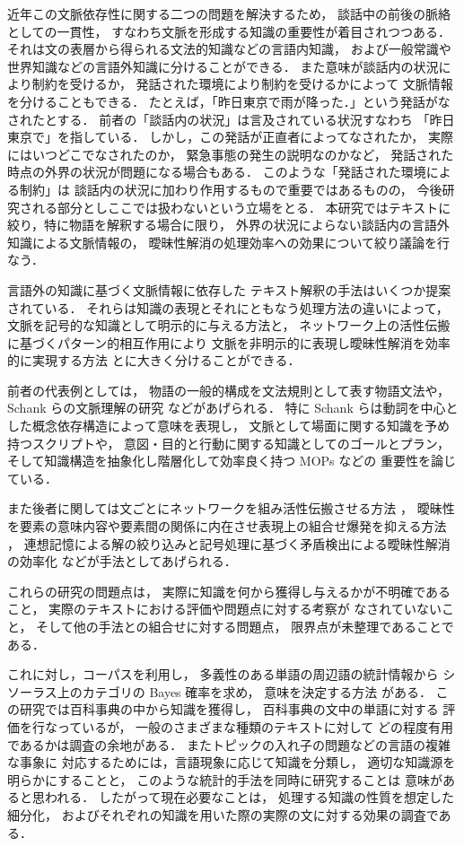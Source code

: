 近年この文脈依存性に関する二つの問題を解決するため，
談話中の前後の脈絡としての一貫性，
すなわち文脈を形成する知識の重要性が着目されつつある．
それは文の表層から得られる文法的知識などの言語内知識，
および一般常識や世界知識などの言語外知識に分けることができる．
また意味が談話内の状況により制約を受けるか，
発話された環境により制約を受けるかによって
文脈情報を分けることもできる．
たとえば，「昨日東京で雨が降った．」という発話がなされたとする．
前者の「談話内の状況」は言及されている状況すなわち
「昨日東京で」を指している．
しかし，この発話が正直者によってなされたか，
実際にはいつどこでなされたのか，
緊急事態の発生の説明なのかなど，
発話された時点の外界の状況が問題になる場合もある．
このような「発話された環境による制約」は
談話内の状況に加わり作用するもので重要ではあるものの，
今後研究される部分としここでは扱わないという立場をとる．
本研究ではテキストに絞り，特に物語を解釈する場合に限り，
外界の状況によらない談話内の言語外知識による文脈情報の，
曖昧性解消の処理効率への効果について絞り議論を行なう．

言語外の知識に基づく文脈情報に依存した
テキスト解釈の手法はいくつか提案されている．
それらは知識の表現とそれにともなう処理方法の違いによって，
文脈を記号的な知識として明示的に与える方法と，
ネットワーク上の活性伝搬に基づくパターン的相互作用により
文脈を非明示的に表現し曖昧性解消を効率的に実現する方法
とに大きく分けることができる．

前者の代表例としては，
物語の一般的構成を文法規則として表す物語文法\cite{Rumelhart75}や，
Schank らの文脈理解の研究 \cite{Schank77,Schank81,Schank82}
などがあげられる．
特に Schank らは動詞を中心とした概念依存構造によって意味を表現し，
文脈として場面に関する知識を予め持つスクリプトや，
意図・目的と行動に関する知識としてのゴールとプラン，
そして知識構造を抽象化し階層化して効率良く持つ MOPs などの
重要性を論じている．

また後者に関しては文ごとにネットワークを組み活性伝搬させる方法
\cite{Waltz85,Tamura87}，
曖昧性を要素の意味内容や要素間の関係に内在させ表現上の組合せ爆発を抑える方法
\cite{Hirst88,Okumura89,Kojima91}，
連想記憶による解の絞り込みと記号処理に基づく矛盾検出による曖昧性解消の効率化
\cite{Tsunoda93}などが手法としてあげられる．

これらの研究の問題点は，
実際に知識を何から獲得し与えるかが不明確であること，
実際のテキストにおける評価や問題点に対する考察が
なされていないこと，
そして他の手法との組合せに対する問題点，
限界点が未整理であることである．

これに対し，コーパスを利用し，
多義性のある単語の周辺語の統計情報から
シソーラス上のカテゴリの Bayes 確率を求め，
意味を決定する方法\cite{Yarowsky92}
がある．
この研究では百科事典の中から知識を獲得し，
百科事典の文中の単語に対する
評価を行なっているが，
一般のさまざまな種類のテキストに対して
どの程度有用であるかは調査の余地がある．
またトピックの入れ子の問題などの言語の複雑な事象に
対応するためには，言語現象に応じて知識を分類し，
適切な知識源を明らかにすることと，
このような統計的手法を同時に研究することは
意味があると思われる．
したがって現在必要なことは，
処理する知識の性質を想定した細分化，
およびそれぞれの知識を用いた際の実際の文に対する効果の調査である．

